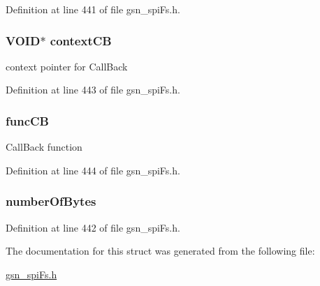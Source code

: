 Definition at line 441 of file gsn\_\-spiFs.h.

\hypertarget{a00237_a2898b010839acbc30fb49ec89189292c}{
\subsubsection[{contextCB}]{\setlength{\rightskip}{0pt plus 5cm}VOID$\ast$ {\bf contextCB}}}
\label{a00237_a2898b010839acbc30fb49ec89189292c}
context pointer for CallBack 

Definition at line 443 of file gsn\_\-spiFs.h.

\hypertarget{a00237_a506259129a056fa472fce11e8ad5421f}{
\subsubsection[{funcCB}]{ {\bf funcCB}}}
\label{a00237_a506259129a056fa472fce11e8ad5421f}
CallBack function 

Definition at line 444 of file gsn\_\-spiFs.h.

\hypertarget{a00237_aa38439c1a3431e9af92418009b525efa}{
\subsubsection[{numberOfBytes}]{ {\bf numberOfBytes}}}
\label{a00237_aa38439c1a3431e9af92418009b525efa}


Definition at line 442 of file gsn\_\-spiFs.h.



The documentation for this struct was generated from the following file:\begin{DoxyCompactItemize}
\item 
\hyperlink{a00589}{gsn\_\-spiFs.h}\end{DoxyCompactItemize}
